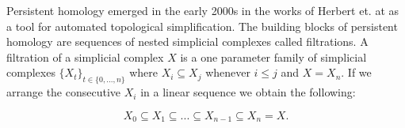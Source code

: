 Persistent homology emerged in the early 2000s in the works of Herbert et. at \cite{persistence-original} as a tool for automated topological simplification. The building blocks of persistent homology are sequences of nested simplicial complexes called filtrations. A filtration of a simplicial complex $X$ is a one parameter family of simplicial complexes $\{X_t\}_{t \in \{0, ..., n\}}$ where $X_i \subseteq X_j$ whenever $i \le j$ and $X = X_n$. If we arrange the consecutive $X_i$ in a linear sequence we obtain the following:


$$ X_0 \subseteq X_1 \subseteq ... \subseteq X_{n-1} \subseteq X_n = X. $$

